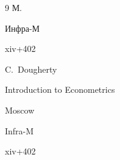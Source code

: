 \begin{thebibliography}{9}
\publaddr М.

\publ Инфра-М


\totalpages xiv+402

\misctransl

\by C.~Dougherty 

\book Introduction to Econometrics

\publaddr Moscow

\publ Infra-M


\totalpages xiv+402





\end{thebibliography}







\noindent

\hskip6.5cm \thedate \par\noindent

\hskip6.5cm\therevdate













\makeengtitlem







 \newpage

%


%

%

